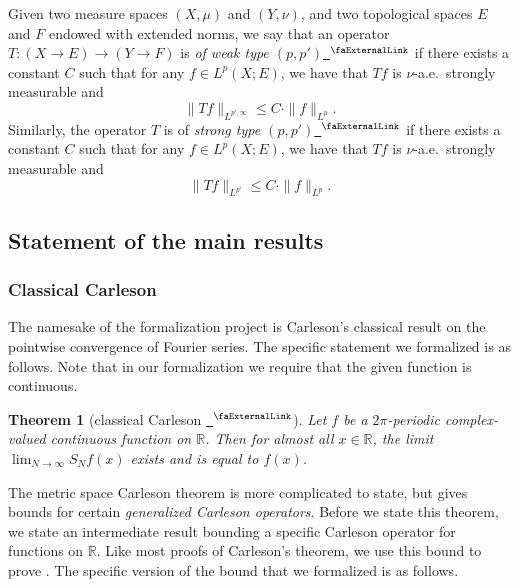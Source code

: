 \documentclass[12pt, reqno]{amsart}
\newcommand*{\real}{\mathbb{R}} %
\newcommand{\extlink}{~\ensuremath{{}^\text{\faExternalLink}}}
\theoremstyle{definition}
\theoremstyle{plain}
\newtheorem{theorem}{Theorem}[subsection]
\begin{document}
Given two measure spaces $(X,\mu)$ and $(Y,\nu)$, and two topological spaces $E$ and $F$ endowed with extended norms, we say that an operator $T\colon (X \to E) \to (Y \to F)$ is \emph{of weak type $(p,p')$}\href{https://github.com/fpvandoorn/carleson/blob/AFM-frozen/Carleson/ToMathlib/WeakType.lean#L418-L420}{\extlink} if there exists a constant $C$ such that for any $f\in L^p(X; E)$, we have that $T f$ is $\nu$-a.e.\ strongly measurable and
\begin{equation*}
  \|T f\|_{L^{p',\infty}} \le C \cdot \|f\|_{L^p}.
\end{equation*}
Similarly, the operator $T$ is of \emph{strong type $(p, p')$}\href{https://github.com/fpvandoorn/carleson/blob/AFM-frozen/Carleson/ToMathlib/WeakType.lean#L432-L435}{\extlink} if there exists a constant $C$ such that for any $f\in L^p(X; E)$, we have that $T f$ is $\nu$-a.e.\ strongly measurable and
\begin{equation*}
  \|T f\|_{L^{p'}} \le C \cdot \|f\|_{L^p}.
\end{equation*}

\subsection{Statement of the main results}\label{subsec:main_results}

\subsubsection{Classical Carleson}\label{subsubsec:classical-result}

The namesake of the formalization project is Carleson's classical result on the pointwise convergence of Fourier series.
The specific statement we formalized is as follows. Note that in our formalization we require that the given function is continuous.

\begin{theorem}[classical Carleson \cite{carleson}\href{https://github.com/fpvandoorn/carleson/blob/AFM-frozen/Carleson/Classical/ClassicalCarleson.lean\#L131-L132}{\extlink}]
    \label{classical-carleson}
    Let $f$ be a $2\pi$-periodic complex-valued continuous function on $\mathbb{R}$.
    Then for almost all $x \in \mathbb{R}$, the limit
    $\lim_{N\to\infty} S_N f(x)$ exists and is equal to $f(x)$.
\end{theorem}

The metric space Carleson theorem is more complicated to state, but gives bounds for certain \emph{generalized Carleson operators}.
Before we state this theorem, we state an intermediate result
bounding a specific Carleson operator for functions on $\real$.
Like most proofs of Carleson's theorem, we use this bound to prove .
The specific version of the bound that we formalized is as follows.
\end{document}
